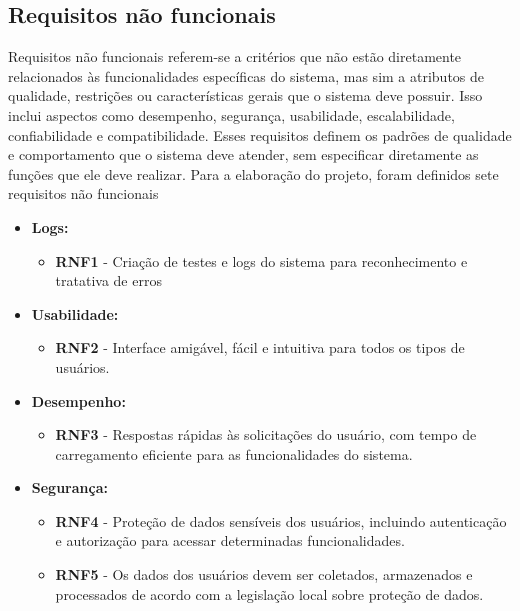     
\subsection{Requisitos não funcionais}

Requisitos não funcionais referem-se a critérios que não estão diretamente relacionados às funcionalidades específicas do sistema, mas sim a atributos de qualidade, restrições ou características gerais que o sistema deve possuir. Isso inclui aspectos como desempenho, segurança, usabilidade, escalabilidade, confiabilidade e compatibilidade. Esses requisitos definem os padrões de qualidade e comportamento que o sistema deve atender, sem especificar diretamente as funções que ele deve realizar. Para a elaboração do projeto, foram definidos sete requisitos não funcionais

\begin{itemize}
    \item \textbf{Logs:}
    \begin{itemize}
        \item \textbf{RNF1} - Criação de testes e logs do sistema para reconhecimento e tratativa de erros
    \end{itemize}

    \item \textbf{Usabilidade:}
    \begin{itemize}
        \item \textbf{RNF2} - Interface amigável, fácil e intuitiva para todos os tipos de usuários.
    \end{itemize}

    \item \textbf{Desempenho:}
    \begin{itemize}
        \item \textbf{RNF3} - Respostas rápidas às solicitações do usuário, com tempo de carregamento eficiente para as funcionalidades do sistema.
    \end{itemize}

    \item \textbf{Segurança:}
    \begin{itemize}
        \item \textbf{RNF4} - Proteção de dados sensíveis dos usuários, incluindo autenticação e autorização para acessar determinadas funcionalidades.
        \item \textbf{RNF5} - Os dados dos usuários devem ser coletados, armazenados e processados de acordo com a legislação local sobre proteção de dados.
    \end{itemize}


\end{itemize}
